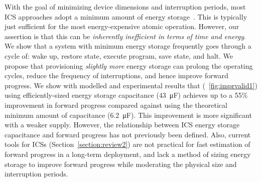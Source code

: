 With the goal of minimizing device dimensions and interruption periods, most ICS approaches adopt a minimum amount of energy storage~\cite{balsamo2016hibernus++, 10.1145/2700249, 10.1145/2809695.2809707, 10.1145/3281300, 222579}. 
This is typically just sufficient for the most energy-expensive atomic operation. 
However, our assertion is that this can be \textit{inherently inefficient in terms of time and energy}. 
We show that a system with minimum energy storage frequently goes through a cycle of: wake up, restore state, execute program, save state, and halt.
We propose that provisioning \textit{slightly more} energy storage can prolong the operating cycles, reduce the frequency of interruptions, and hence improve forward progress. We show with modelled and experimental results that (\figurename{~\ref{fig:imprvalid1}}) using efficiently-sized energy storage capacitance (\SI{43}{\micro\farad}) achieves up to a 55\% improvement in forward progress compared against using the theoretical minimum amount of capacitance (\SI{6.2}{\micro\farad}). This improvement is more significant with a weaker supply. 
However, the relationship between ICS energy storage capacitance and forward progress has not previously been defined. Also, current tools for ICSs (Section~\ref{section:review2}) are not practical for fast estimation of forward progress in a long-term deployment, and lack a method of sizing energy storage to improve forward progress while moderating the physical size and interruption periods. 

